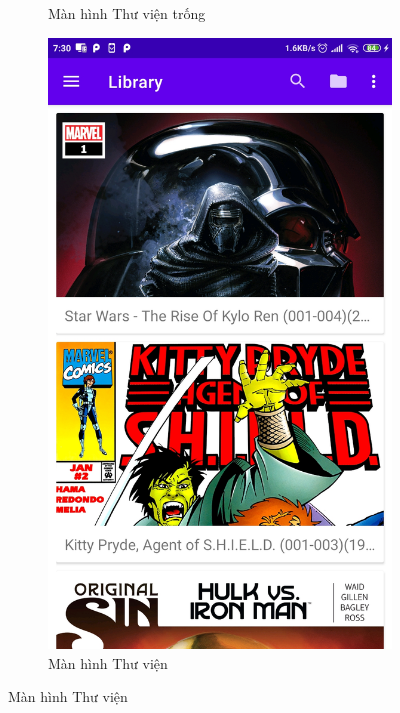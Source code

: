 \documentclass[../../thesis]{subfiles}
\begin{document}
\begin{figure}[H]
\begin{subfigure}[b]{0.328\textwidth}
        \caption{Màn hình Thư viện trống}
        \label{fig:empty_library_screen}
    \end{subfigure}
    \hfill
    \begin{subfigure}[b]{0.328\textwidth}
        \centering
        \includegraphics[scale=0.12]{../images/Screenshot_2021-05-25-07-30-21-599_com.uet.nvmnghia.yacv}
        \caption{Màn hình Thư viện}
        \label{fig:library_screen}
    \end{subfigure}
    \hfill

\end{figure}
\end{document}
